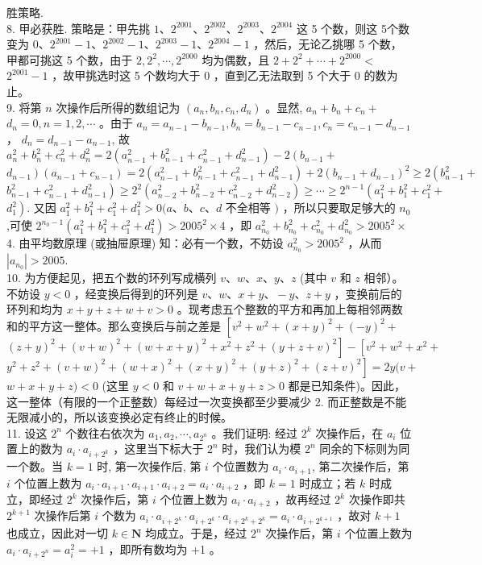 \documentclass[10pt]{article}
\begin{document}
胜策略.\\
8. 甲必获胜. 策略是：甲先挑 $1 、 2^{2001} 、 2^{2002} 、 2^{2003} 、 2^{2004}$ 这 5 个数，则这 5个数变为 $0 、 2^{2001}-1 、 2^{2002}-1 、 2^{2003}-1 、 2^{2004}-1$ ，然后，无论乙挑哪 5 个数，甲都可挑这 5 个数，由于 $2,2^{2}, \cdots, 2^{2000}$ 均为偶数，且 $2+2^{2}+\cdots+2^{2000}<$ $2^{2001}-1$ ，故甲挑选时这 5 个数均大于 0 ，直到乙无法取到 5 个大于 0 的数为止。\\
9. 将第 $n$ 次操作后所得的数组记为 $\left(a_{n}, b_{n}, c_{n}, d_{n}\right)$ 。显然, $a_{n}+b_{n}+c_{n}+$ $d_{n}=0, n=1,2, \cdots$ 。由于 $a_{n}=a_{n-1}-b_{n-1}, b_{n}=b_{n-1}-c_{n-1}, c_{n}=c_{n-1}-d_{n-1}$ ， $d_{n}=d_{n-1}-a_{n-1}$, 故 $a_{n}^{2}+b_{n}^{2}+c_{n}^{2}+d_{n}^{2}=2\left(a_{n-1}^{2}+b_{n-1}^{2}+c_{n-1}^{2}+d_{n-1}^{2}\right)-2\left(b_{n-1}+\right.$ $\left.d_{n-1}\right)\left(a_{n-1}+c_{n-1}\right)=2\left(a_{n-1}^{2}+b_{n-1}^{2}+c_{n-1}^{2}+d_{n-1}^{2}\right)+2\left(b_{n-1}+d_{n-1}\right)^{2} \geqslant 2\left(b_{n-1}^{2}+\right.$ $\left.b_{n-1}^{2}+c_{n-1}^{2}+d_{n-1}^{2}\right) \geqslant 2^{2}\left(a_{n-2}^{2}+b_{n-2}^{2}+c_{n-2}^{2}+d_{n-2}^{2}\right) \geqslant \cdots \geqslant 2^{n-1}\left(a_{1}^{2}+b_{1}^{2}+c_{1}^{2}+\right.$ $\left.d_{1}^{2}\right)$. 又因 $a_{1}^{2}+b_{1}^{2}+c_{1}^{2}+d_{1}^{2}>0(a 、 b 、 c 、 d$ 不全相等 $)$ ，所以只要取足够大的 $n_{0}$,可使 $2^{n_{0}-1}\left(a_{1}^{2}+b_{1}^{2}+c_{1}^{2}+d_{1}^{2}\right)>2005^{2} \times 4$ ，即 $a_{n_{0}}^{2}+b_{n_{0}}^{2}+c_{n_{0}}^{2}+d_{n_{0}}^{2}>2005^{2} \times$ 4. 由平均数原理 (或抽屉原理) 知：必有一个数，不妨设 $a_{n_{0}}^{2}>2005^{2}$ ，从而 $\left|a_{n_{0}}\right|>2005$.\\
10. 为方便起见，把五个数的环列写成横列 $v 、 w 、 x 、 y 、 z$ (其中 $v$ 和 $z$ 相邻）。不妨设 $y<0$ ，经变换后得到的环列是 $v 、 w 、 x+y 、-y 、 z+y$ ，变换前后的环列和均为 $x+y+z+w+v>0$ 。现考虑五个整数的平方和再加上每相邻两数和的平方这一整体。那么变换后与前之差是 $\left[v^{2}+w^{2}+(x+y)^{2}+(-y)^{2}+\right.$ $\left.(z+y)^{2}+(v+w)^{2}+(w+x+y)^{2}+x^{2}+z^{2}+(y+z+v)^{2}\right]-\left[v^{2}+w^{2}+x^{2}+\right.$ $\left.y^{2}+z^{2}+(v+w)^{2}+(w+x)^{2}+(x+y)^{2}+(y+z)^{2}+(z+v)^{2}\right]=2 y(v+$ $w+x+y+z)<0$ (这里 $y<0$ 和 $v+w+x+y+z>0$ 都是已知条件)。因此，这一整体（有限的一个正整数）每经过一次变换都至少要减少 2. 而正整数是不能无限减小的，所以该变换必定有终止的时候。\\
11. 设这 $2^{n}$ 个数往右依次为 $a_{1}, a_{2}, \cdots, a_{2^{n}}$ 。我们证明: 经过 $2^{k}$ 次操作后，在 $a_{i}$ 位置上的数为 $a_{i} \cdot a_{i+2^{k}}$ ，这里当下标大于 $2^{n}$ 时，我们认为模 $2^{n}$ 同余的下标则为同一个数。当 $k=1$ 时, 第一次操作后, 第 $i$ 个位置数为 $a_{i} \cdot a_{i+1}$, 第二次操作后，第 $i$ 个位置上数为 $a_{i} \cdot a_{i+1} \cdot a_{i+1} \cdot a_{i+2}=a_{i} \cdot a_{i+2}$ ，即 $k=1$ 时成立；若 $k$ 时成立，即经过 $2^{k}$ 次操作后，第 $i$ 个位置上数为 $a_{i} \cdot a_{i+2}$ ，故再经过 $2^{k}$ 次操作即共 $2^{k+1}$ 次操作后第 $i$ 个数为 $a_{i} \cdot a_{i+2^{k}} \cdot a_{i+2^{k}} \cdot a_{i+2^{k}+2^{k}}=a_{i} \cdot a_{i+2^{k+1}}$ ，故对 $k+1$ 也成立，因此对一切 $k \in \mathbf{N}$ 均成立。于是，经过 $2^{n}$ 次操作后，第 $i$ 个位置上数为 $a_{i} \cdot a_{i+2^{n}}=a_{i}^{2}=+1$ ，即所有数均为 +1 。
\end{document}
